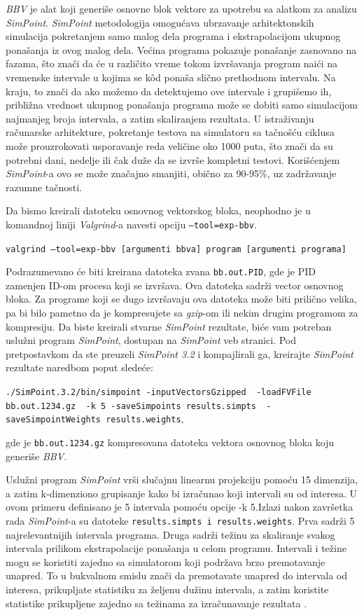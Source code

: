 \documentclass[12pt,oneside]{memoir}
\theoremstyle{plain}
\theoremstyle{definition}
\begin{document}
\textit{BBV} je alat koji generiše osnovne blok vektore za upotrebu sa alatkom za analizu \textit{SimPoint}. \textit{SimPoint} metodologija omogućava ubrzavanje arhitektonskih simulacija pokretanjem samo malog dela programa i ekstrapolacijom ukupnog ponašanja iz ovog malog dela. Većina programa pokazuje ponašanje zasnovano na fazama, što znači da će u različito vreme tokom izvršavanja program naići na vremenske intervale u kojima se k\^od ponaša slično prethodnom intervalu. Na kraju, to znači da ako možemo da detektujemo ove intervale i grupišemo ih, približna vrednost ukupnog ponašanja programa može se dobiti samo simulacijom najmanjeg broja intervala, a zatim skaliranjem rezultata. U istraživanju računarske arhitekture, pokretanje testova na simulatoru sa tačnošću ciklusa može prouzrokovati usporavanje reda veličine oko 1000 puta, što znači da su potrebni dani, nedelje ili čak duže da se izvrše kompletni  testovi. Korišćenjem \textit{SimPoint}-a ovo se može značajno smanjiti, obično za 90-95\%, uz zadržavanje razumne tačnosti.

Da bismo kreirali datoteku osnovnog vektorskog bloka, neophodno je u komandnoj liniji \textit{Valgrind}-a navesti opciju \texttt{–tool=exp-bbv}.
\begin{center}
\texttt{valgrind --tool=exp-bbv [argumenti bbva] program [argumenti programa]}
\end{center}

Podrazumevano će biti kreirana datoteka zvana \texttt{bb.out.PID}, gde je PID zamenjen ID-om procesa koji se izvršava. Ova datoteka sadrži vector osnovnog bloka. Za  programe koji se dugo izvršavaju ova datoteka može biti prilično velika, pa bi bilo pametno da je kompresujete sa \textit{gzip}-om ili nekim drugim programom za kompresiju. Da biste kreirali stvarne \textit{SimPoint} rezultate, biće vam potreban uslužni program \textit{SimPoint}, dostupan na \textit{SimPoint} veb stranici. Pod pretpostavkom da ste preuzeli \textit{SimPoint 3.2} i kompajlirali ga, kreirajte \textit{SimPoint} rezultate naredbom poput sledeće:
\begin{center}
\texttt{./SimPoint.3.2/bin/simpoint -inputVectorsGzipped \
    -loadFVFile bb.out.1234.gz \
    -k 5 -saveSimpoints results.simpts \
    -saveSimpointWeights results.weights},
\end{center}
gde je \texttt{bb.out.1234.gz} kompresovana datoteka vektora osnovnog bloka koju generiše \textit{BBV}.

Uslužni program \textit{SimPoint} vrši slučajnu linearnu projekciju pomoću 15 dimenzija, a zatim k-dimenziono grupisanje kako bi izračunao koji intervali su od interesa. U ovom primeru definisano je 5 intervala pomoću opcije -k 5.Izlazi nakon završetka rada \textit{SimPoint}-a su datoteke \texttt{results.simpts i results.weights}. Prva sadrži 5 najrelevantnijih intervala programa. Druga  sadrži težinu za skaliranje svakog intervala prilikom ekstrapolacije ponašanja u celom programu. Intervali i težine mogu se koristiti zajedno sa simulatorom koji podržava brzo premotavanje unapred. To u bukvalnom smislu znači da premotavate unapred do intervala od interesa, prikupljate statistiku za željenu dužinu intervala, a zatim koristite statistike prikupljene zajedno sa težinama za izračunavanje rezultata \cite{BBV}. 
\end{document}
